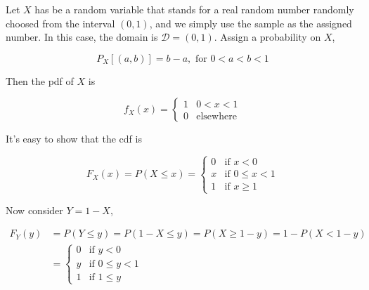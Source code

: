 \documentclass{article}
\begin{document}
            Let $ X $ has be a random variable that stands for a real
            random number randomly choosed from the interval $ (0, 1) $,
            and we simply use the sample as the assigned number. In this case,
            the domain is $ \mathcal{D} = (0, 1) $. Assign a probability on $ X $,

            \begin{equation*}
                P_{X}[(a, b)] = b - a, \text{ for } 0 < a < b < 1
            \end{equation*}

            Then the pdf of $ X $ is

            \begin{equation*}
                 f_{X}(x) =  \left\{
                     \begin{array}{ll}
                         1 & 0 < x < 1 \\
                         0 & \text{elsewhere}
                     \end{array}
                 \right.
            \end{equation*}

            It's easy to show that the cdf is

            \begin{equation*}
                F_{X}(x) = P ( X \leq x ) = \left\{
                     \begin{array}{ll}
                         0 & \text{if } x < 0 \\
                         x & \text{if } 0 \leq x < 1 \\
                         1 & \text{if } x \geq 1
                     \end{array}
                 \right.
            \end{equation*}

            Now consider $ Y = 1 - X $,

            \begin{align*}
                F_{Y}(y) &= P(Y \leq y) = P(1 -X \leq y) = P(X \geq 1 - y) = 1 - P(X < 1 - y) \\
                         &=  \left\{
                             \begin{array}{ll}
                                 0 & \text{if } y < 0        \\
                                 y & \text{if } 0 \leq y < 1 \\
                                 1 & \text{if } 1 \leq y
                             \end{array}
                         \right.
            \end{align*}
\end{document}
